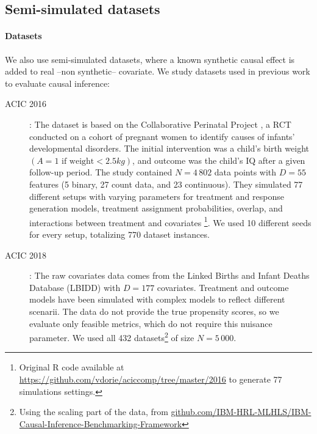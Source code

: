 \documentclass[10pt]{article}
\begin{document}
\begin{multicols}{2}
    \subsection{Semi-simulated datasets}

    \paragraph{Datasets}\label{semi_simulated:datasets}

    We also use semi-simulated datasets, where a known synthetic causal effect is
    added to real --non synthetic-- covariate. We study datasets used in previous work
    to evaluate causal inference:
    \begin{description}
        \item[ACIC 2016] \cite{dorie_automated_2019}: The dataset is based on the
            Collaborative Perinatal Project \cite{niswander_women_1972}, a RCT
            conducted on a cohort of pregnant women to identify causes of infants’
            developmental disorders. The initial intervention was a child’s birth
            weight $(A = 1 \text{ if weight} < 2.5 kg)$, and outcome was the child’s
            IQ after a given follow-up period. The study contained $N=4\,802$ data
            points with $D=55$ features (5 binary, 27 count data, and 23
            continuous). They simulated 77 different setups with varying parameters
            for treatment and response generation models, treatment assignment
            probabilities, overlap, and interactions between treatment and
            covariates \footnote{Original R code available at
                \href{https://github.com/vdorie/aciccomp/tree/master/2016}{https://github.com/vdorie/aciccomp/tree/master/2016}
                to generate 77 simulations settings.}. We used 10 different seeds for
            every setup, totalizing 770 dataset instances.

        \item[ACIC 2018] \cite{shimoni_benchmarking_2018}: The raw covariates
            data comes from the Linked Births and Infant Deaths Database (LBIDD)
            \cite{macdorman_infant_1998} with $D=177$ covariates. Treatment and
            outcome models have been simulated with complex models to reflect
            different scenarii. The data do not provide the true propensity
            scores, so we evaluate only feasible metrics, which do not require this
            nuisance parameter. We used all 432 datasets\footnote{Using the scaling part of the data, from
                \href{https://github.com/IBM-HRL-MLHLS/IBM-Causal-Inference-Benchmarking-Framework}{github.com/IBM-HRL-MLHLS/IBM-Causal-Inference-Benchmarking-Framework}} of size $N=5\,000$.



\end{description}
\end{multicols}
\end{document}
